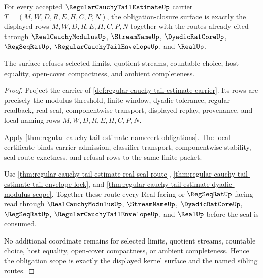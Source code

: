 \begin{theorem}
\label{thm:regular-cauchy-tail-estimate-obligation-scope}
For every accepted $\RegularCauchyTailEstimateUp$ carrier $T=(M,W,D,R,E,H,C,P,N)$, the obligation-closure surface is exactly the displayed rows $M,W,D,R,E,H,C,P,N$ together with the routes already cited through $\RealCauchyModulusUp$, $\StreamNameUp$, $\DyadicRatCoreUp$, $\RegSeqRatUp$, $\RegularCauchyTailEnvelopeUp$, and $\RealUp$.

The surface refuses selected limits, quotient streams, countable choice, host equality, open-cover compactness, and ambient completeness.
\end{theorem}
\begin{proof}
Project the carrier of \autoref{def:regular-cauchy-tail-estimate-carrier}. Its rows are precisely the modulus threshold, finite window, dyadic tolerance, regular readback, real seal, componentwise transport, displayed replay, provenance, and local naming rows $M,W,D,R,E,H,C,P,N$.

Apply \autoref{thm:regular-cauchy-tail-estimate-namecert-obligations}. The local certificate binds carrier admission, classifier transport, componentwise stability, seal-route exactness, and refusal rows to the same finite packet.

Use \autoref{thm:regular-cauchy-tail-estimate-real-seal-route}, \autoref{thm:regular-cauchy-tail-estimate-tail-envelope-lock}, and \autoref{thm:regular-cauchy-tail-estimate-dyadic-modulus-scope}. Together these route every Real-facing or $\RegSeqRatUp$-facing read through $\RealCauchyModulusUp$, $\StreamNameUp$, $\DyadicRatCoreUp$, $\RegSeqRatUp$, $\RegularCauchyTailEnvelopeUp$, and $\RealUp$ before the seal is consumed.

No additional coordinate remains for selected limits, quotient streams, countable choice, host equality, open-cover compactness, or ambient completeness. Hence the obligation scope is exactly the displayed kernel surface and the named sibling routes.
\end{proof}

